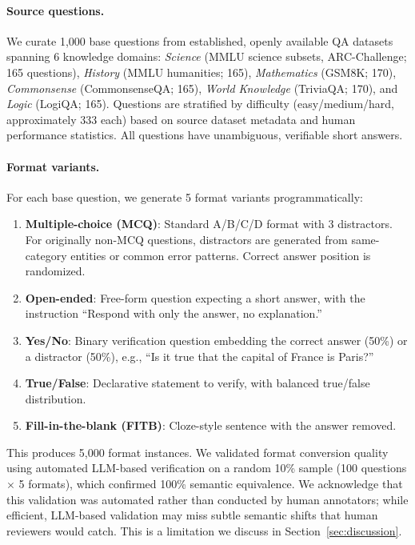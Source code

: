 \documentclass{article}
\begin{document}
\paragraph{Source questions.}
We curate 1,000 base questions from established, openly available QA datasets spanning 6 knowledge domains: \emph{Science} (MMLU science subsets, ARC-Challenge; 165 questions), \emph{History} (MMLU humanities; 165), \emph{Mathematics} (GSM8K; 170), \emph{Commonsense} (CommonsenseQA; 165), \emph{World Knowledge} (TriviaQA; 170), and \emph{Logic} (LogiQA; 165). Questions are stratified by difficulty (easy/medium/hard, approximately 333 each) based on source dataset metadata and human performance statistics. All questions have unambiguous, verifiable short answers.

\paragraph{Format variants.}
For each base question, we generate 5 format variants programmatically:
\begin{enumerate}
    \item \textbf{Multiple-choice (MCQ)}: Standard A/B/C/D format with 3 distractors. For originally non-MCQ questions, distractors are generated from same-category entities or common error patterns. Correct answer position is randomized.
    \item \textbf{Open-ended}: Free-form question expecting a short answer, with the instruction ``Respond with only the answer, no explanation.''
    \item \textbf{Yes/No}: Binary verification question embedding the correct answer (50\%) or a distractor (50\%), e.g., ``Is it true that the capital of France is Paris?''
    \item \textbf{True/False}: Declarative statement to verify, with balanced true/false distribution.
    \item \textbf{Fill-in-the-blank (FITB)}: Cloze-style sentence with the answer removed.
\end{enumerate}
This produces 5,000 format instances. We validated format conversion quality using automated LLM-based verification on a random 10\% sample (100 questions $\times$ 5 formats), which confirmed 100\% semantic equivalence. We acknowledge that this validation was automated rather than conducted by human annotators; while efficient, LLM-based validation may miss subtle semantic shifts that human reviewers would catch. This is a limitation we discuss in Section~\ref{sec:discussion}.
\end{document}

